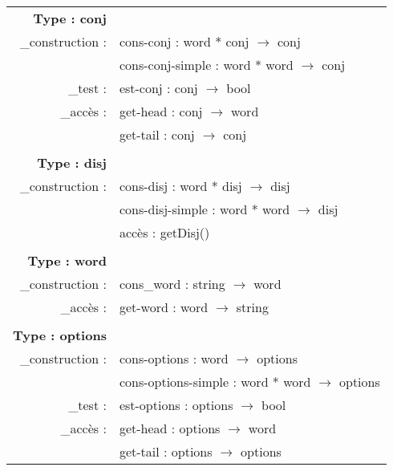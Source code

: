 \begin{tabular}{r l}
\textbf{Type : conj} &\\
_construction :& cons-conj : word * conj $\rightarrow$ conj\\
& cons-conj-simple : word * word $\rightarrow$ conj\\
_test :& est-conj : conj $\rightarrow$ bool\\
_accès :& get-head : conj $\rightarrow$ word\\
& get-tail : conj $\rightarrow$ conj\\
& \\

\textbf{Type : disj}&\\
_construction :& cons-disj : word * disj $\rightarrow$ disj\\
& cons-disj-simple : word * word $\rightarrow$ disj\\
& accès : getDisj()\\
& \\

\textbf{Type : word}&\\ 
_construction :& cons_word : string $\rightarrow$ word\\
_accès :& get-word : word $\rightarrow$ string\\
& \\

\textbf{Type : options}&\\
_construction :& cons-options : word $\rightarrow$ options\\
& cons-options-simple : word * word $\rightarrow$ options\\
_test :& est-options : options $\rightarrow$ bool\\
_accès :& get-head : options $\rightarrow$ word\\
& get-tail : options $\rightarrow$ options
\end{tabular}


